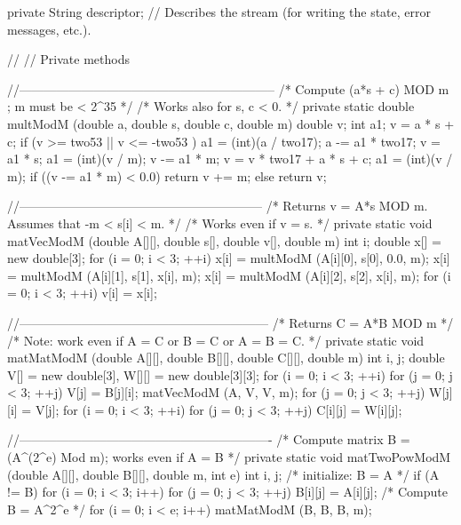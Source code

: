 \begin{code}
\begin{hide}
{   private String descriptor;
   // Describes the stream (for writing the state, error messages, etc.).

// %
// Private methods

    //--------------------------------------------------------------
    /* Compute (a*s + c) MOD m ; m must be < 2^35 */
    /* Works also for s, c < 0.                   */
    private static double multModM 
           (double a, double s, double c, double m) {
        double v;
        int a1;
        v = a * s + c;
        if (v >= two53 || v <= -two53 ) {
                a1 = (int)(a / two17);  a -= a1 * two17;
                v  = a1 * s;
                a1 = (int)(v / m);    v -= a1 * m;
                v  = v * two17 + a * s + c;
        }
        a1 = (int)(v / m);
        if ((v -= a1 * m) < 0.0) return v += m; else return v;
    }


    //-----------------------------------------------------------
    /* Returns v = A*s MOD m.  Assumes that -m < s[i] < m. */
    /* Works even if v = s.                                */
    private static void matVecModM (double A[][], double s[], 
                                    double v[], double m) {
            int i;
            double x[] = new double[3];
            for (i = 0; i < 3;  ++i) {
                x[i] = multModM (A[i][0], s[0], 0.0, m);
                x[i] = multModM (A[i][1], s[1], x[i], m);
                x[i] = multModM (A[i][2], s[2], x[i], m);
            }
            for (i = 0; i < 3;  ++i)  v[i] = x[i];
    }

    //------------------------------------------------------------
    /* Returns C = A*B MOD m */
    /* Note: work even if A = C or B = C or A = B = C.         */
    private static void matMatModM (double A[][], double B[][], 
                                    double C[][], double m){
             int i, j;
             double V[] = new double[3], W[][] = new double[3][3];
             for (i = 0; i < 3;  ++i) {
                    for (j = 0; j < 3;  ++j)  V[j] = B[j][i];
                            matVecModM (A, V, V, m);
                    for (j = 0; j < 3;  ++j)  W[j][i] = V[j];
             }
             for (i = 0; i < 3;  ++i) {
                    for (j = 0; j < 3;  ++j)
                        C[i][j] = W[i][j];
             }
    }

    //-------------------------------------------------------------
    /* Compute matrix B = (A^(2^e) Mod m);  works even if A = B */
    private static void matTwoPowModM (double A[][], double B[][], 
                                       double m, int e) {
            int i, j;
            /* initialize: B = A */
            if (A != B) {
                for (i = 0; i < 3; i++) {
                    for (j = 0; j < 3;  ++j)  B[i][j] = A[i][j];
                }
            }
            /* Compute B = A^{2^e} */
            for (i = 0; i < e; i++) matMatModM (B, B, B, m);
    }

}
\end{hide}
\end{code}
